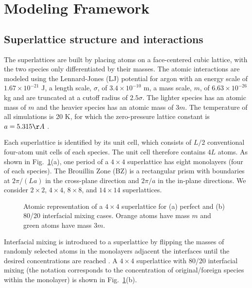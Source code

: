 \section{Modeling Framework}\label{SEC:modeling}
\subsection{Superlattice structure and interactions}\label{SEC:sl_struc}
The superlattices are built by placing atoms on a face-centered cubic lattice, with the two species only differentiated by their masses. The atomic interactions are modeled using the Lennard-Jones (LJ) potential for argon with an energy scale of $1.67\times10^{-21}$ J, a length scale, $\sigma$, of $3.4\times10^{-10}$ m, a mass scale, $m$, of $6.63\times10^{-26}$ kg and are truncated at a cutoff radius of $2.5\sigma$. The lighter species has an atomic mass of $m$ and the heavier species has an atomic mass of $3m$. The temperature of all simulations is 20 K, for which the zero-pressure lattice constant is $a=5.315 \AA$ \cite{mcgaugheythesis}. %

Each superlattice is identified by its unit cell, which consists of $L/2$ conventional four-atom unit cells of each species. The unit cell therefore contains $4L$ atoms. As shown in Fig.~\ref{fig:md_domain}(a), one period of a $4\times4$ superlattice has eight monolayers (four of each species). The Brouillin Zone (BZ) is a rectangular prism with boundaries at $2\pi/(La)$ in the cross-plane direction and $2\pi/a$ in the in-plane directions. We consider $2\times2$, $4\times4$, $8\times8$, and $14\times14$ superlattices.
\begin{figure}[t!]
\begin{center}
\renewcommand{\figure}{Fig.}
\caption{Atomic representation of a $4\times4$ superlattice for (a) perfect and (b) 80/20 interfacial mixing cases. Orange atoms have mass  $m$ and green atoms have mass $3m$.}
\label{fig:md_domain}
\end{center}
\end{figure}

Interfacial mixing is introduced to a superlattice by flipping the masses of randomly selected atoms in the monolayers adjacent the interfaces until the desired concentrations are reached \cite{PhysRevB.79.075316}. A $4\times4$ superlattice with 80/20 interfacial mixing (the notation corresponds to the concentration of original/foreign species within the monolayer) is shown in Fig.~\ref{fig:md_domain}(b).

